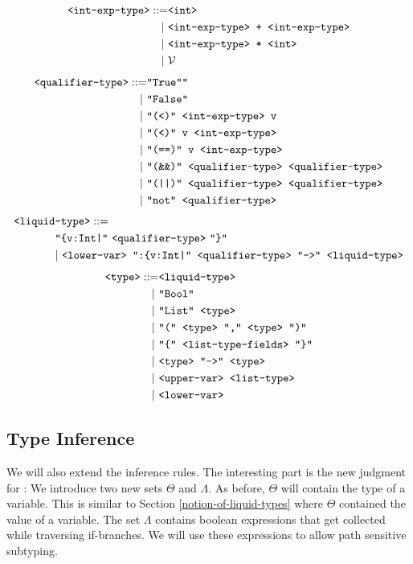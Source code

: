 \documentclass[]{scrbook}
\newcommand{\mf}[1]{\text{\texttt{#1}}}
\theoremstyle{definition}
\theoremstyle{definition}
\theoremstyle{definition}
\theoremstyle{remark}
\begin{document}
\[
  \begin{aligned}
    \mf{<int-exp-type>} ::=& \mf{<int>}\\
      | \ & \mf{<int-exp-type> + <int-exp-type>}\\
      | \ & \mf{<int-exp-type> * <int>}\\
      | \ & \mathcal{V}
  \end{aligned}
\] \[
  \begin{aligned}
    \mf{<qualifier-type>} ::=& \mf{"True""}\\
      | \ & \mf{"False"}\\
      | \ & \mf{"(<)" <int-exp-type> v}\\
      | \ & \mf{"(<)" v <int-exp-type>}\\
      | \ & \mf{"(==)" v <int-exp-type>}\\
      | \ & \mf{"(\&\&)" <qualifier-type> <qualifier-type>}\\
      | \ & \mf{"(||)" <qualifier-type> <qualifier-type>}\\
      | \ & \mf{"not" <qualifier-type>}
  \end{aligned}
\] \[
\begin{aligned}
\mf{<liquid}&\mf{-type>} ::=\\
  & \mf{"\{v:Int|"} \ \mf{<qualifier-type>} \ \mf{"\}"} \\
  &| \ \mf{<lower-var> ":\{v:Int|" <qualifier-type> "->" <liquid-type>}
\end{aligned}
\] \[
\begin{aligned}
\mf{<type>} ::=& \mf{<liquid-type>}\\
           | \ & \mf{"Bool"}\\
           | \ & \mf{"List" <type>}\\
           | \ & \mf{"(" <type> "," <type> ")"}\\
           | \ & \mf{"\{" <list-type-fields> "\}"}\\
           | \ & \mf{<type> "->" <type>}\\
           | \ & \mf{<upper-var> <list-type>}\\
           | \ & \mf{<lower-var>}
\end{aligned}
\]

\subsection{Type Inference}\label{type-inference-1}

We will also extend the inference rules. The interesting part is the new
judgment for \mf{<exp>}: We introduce two new sets \(\Theta\) and
\(\Lambda\). As before, \(\Theta\) will contain the type of a variable.
This is similar to Section \ref{notion-of-liquid-types} where \(\Theta\)
contained the value of a variable. The set \(\Lambda\) contains boolean
expressions that get collected while traversing if-branches. We will use
these expressions to allow path sensitive subtyping.
\end{document}

